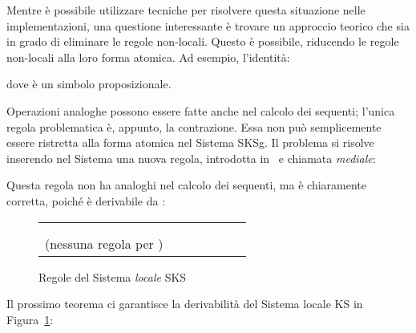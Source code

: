 \documentclass[12pt,a4paper,openright,twoside]{report}
\begin{document}
Mentre \`e possibile utilizzare tecniche per risolvere questa situazione nelle implementazioni, una questione interessante \`e trovare un approccio teorico che sia in grado di eliminare le regole non-locali. Questo \`e possibile, riducendo le regole non-locali alla loro forma atomica. Ad esempio, l'identit\`a:

dove  \`e un simbolo proposizionale.

Operazioni analoghe possono essere fatte anche nel calcolo dei sequenti; l'unica regola problematica \`e, appunto, la contrazione. Essa non pu\`o semplicemente essere ristretta alla forma atomica nel Sistema \textsf{SKSg}. Il problema si risolve inserendo nel Sistema una nuova regola, introdotta in~\cite{BruTiu01} e chiamata \emph{mediale}:

Questa regola non ha analoghi nel calcolo dei sequenti, ma \`e chiaramente corretta, poich\'e \`e derivabile da :


\begin{figure}
\begin{tabular}{ccccccc}
	 & \quad\quad &
	 & \quad\quad &
	 & \quad\quad &
	 \\\\
	\begin{minipage}[c]{6em}\centering(nessuna regola per )\end{minipage} & \qquad\quad &
	 & \quad\quad &
	 & \quad\quad &
	 
\end{tabular}
\vspace{1em}

\caption{Regole del Sistema \emph{locale} \textsf{SKS}}
\label{fig:sks_cos}
\end{figure}

Il prossimo teorema ci garantisce la derivabilit\`a del Sistema locale \textsf{KS} in Figura~\ref{fig:sks_cos}:
\end{document}
